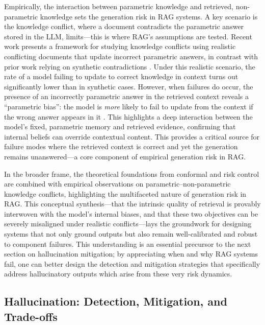 \documentclass[11pt]{article}
\begin{document}
Empirically, the interaction between parametric knowledge and retrieved, non-parametric knowledge sets the generation risk in RAG systems. A key scenario is the knowledge conflict, where a document contradicts the parametric answer stored in the LLM, limits---this is where RAG's assumptions are tested. Recent work presents a framework for studying knowledge conflicts using realistic conflicting documents that update incorrect parametric answers, in contrast with prior work relying on synthetic contradictions \cite{ref9}. Under this realistic scenario, the rate of a model failing to update to correct knowledge in context turns out significantly lower than in synthetic cases. However, when failures do occur, the presence of an incorrectly parametric answer in the retrieved context reveals a ``parametric bias'': the model is \emph{more} likely to fail to update from the context if the wrong answer appears in it \cite{ref9}. This highlights a deep interaction between the model's fixed, parametric memory and retrieved evidence, confirming that internal beliefs can override contextual content. This provides a critical source for failure modes where the retrieved context is correct and yet the generation remains unanswered---a core component of empirical generation risk in RAG.

In the broader frame, the theoretical foundations from conformal and risk control are combined with empirical observations on parametric--non-parametric knowledge conflicts, highlighting the multifaceted nature of generation risk in RAG. This conceptual synthesis---that the intrinsic quality of retrieval is provably interwoven with the model's internal biases, and that these two objectives can be severely misaligned under realistic conflicts---lays the groundwork for designing systems that not only ground outputs but also remain well-calibrated and robust to component failures. This understanding is an essential precursor to the next section on hallucination mitigation; by appreciating when and why RAG systems fail, one can better design the detection and mitigation strategies that specifically address hallucinatory outputs which arise from these very risk dynamics.

\subsection{Hallucination: Detection, Mitigation, and Trade-offs}
\end{document}
